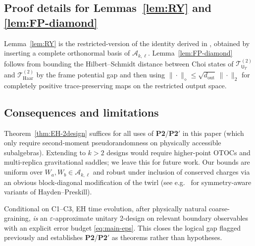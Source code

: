 \documentclass[11pt,a4paper]{article}
\newcommand{\Ptwo}{\textbf{P2}\xspace}
\newcommand{\PtwoPrime}{\textbf{P2$'$}\xspace}
\theoremstyle{plain}
\theoremstyle{definition}
\theoremstyle{remark}
\begin{document}
\subsection*{Proof details for Lemmas~\ref{lem:RY} and \ref{lem:FP-diamond}}
Lemma~\ref{lem:RY} is the restricted-version of the identity derived in \cite{RobertsYoshida:2017}, obtained by inserting a complete orthonormal basis of $\mathscr{A}_{k,\ell}$.  Lemma~\ref{lem:FP-diamond} follows from bounding the Hilbert--Schmidt distance between Choi states of $\mathcal{T}^{(2)}_{\mathsf{U}_T}$ and $\mathcal{T}^{(2)}_{\mathrm{Haar}}$ by the frame potential gap and then using $\|\cdot\|_\diamond \le \sqrt{d_{\mathrm{out}}}\,\|\cdot\|_2$ for completely positive trace-preserving maps on the restricted output space.

\subsection*{Consequences and limitations}
Theorem~\ref{thm:EH-2design} suffices for all uses of \Ptwo/\PtwoPrime{} in this paper (which only require second-moment pseudorandomness on physically accessible subalgebras).  Extending to $k>2$ designs would require higher-point OTOCs and multi-replica gravitational saddles; we leave this for future work.  Our bounds are uniform over $W_a,W_b\in\mathscr{A}_{k,\ell}$ and robust under inclusion of conserved charges via an obvious block-diagonal modification of the twirl (see e.g.\ \cite{Hayden:2007,NakataWakakuwaKoashi2023} for symmetry-aware variants of Hayden--Preskill).

\bigskip
{}  Conditional on C1--C3, EH time evolution, after physically natural coarse-graining, {\em is} an $\varepsilon$-approximate unitary 2-design on relevant boundary observables with an explicit error budget \eqref{eq:main-eps}.  This closes the logical gap flagged previously and establishes \Ptwo/\PtwoPrime{} as theorems rather than hypotheses.
\end{document}
